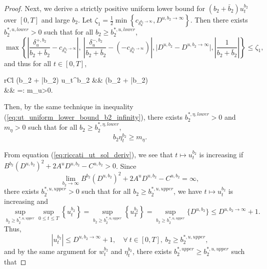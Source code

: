 \documentclass[11pt]{article}
\begin{document}
\begin{proof}
	Next, we derive a strictly positive uniform lower bound for $(b_2 + \bar{b}_2) u_t^{b_2}$ over $[0,T]$ and large $b_2$. Let $\zeta_1 =\frac{1}{2} \min \left\{ c_{\delta_u^{b_2 \to \infty}}, D^{u,b_2 \to \infty} \right\}$. Then there exists $b_2^{*,u,lower}>0$ such that for all $b_2 \geq b_2^{*,u,lower}$,
	$$ 
	\max \left\{  \left\vert \frac{\delta_u^{+,b_2}}{b_2 + \bar{b}_2}  - c_{\delta_u^{b_2 \to \infty}} \right\vert, \   \left\vert \frac{\delta_u^{-,b_2}}{b_2 + \bar{b}_2}  - \left(-c_{\delta_u^{b_2 \to \infty}}\right) \right\vert, \vert D^{u,b_2} - D^{u,b_2\to \infty} \vert,  \left\vert \frac{1}{b_2 + \bar{b}_2} \right\vert  \right\} \leq \zeta_1,
	$$ 
	and thus for all $t \in [0,T]$,
	\begin{IEEEeqnarray}{rCl}
		(b_2 + \bar{b}_2) u_t^{b_2} &\geq&  (b_2 + \bar{b}_2)  \nonumber \\
		&\geq&  =: m_u>0.
	\label{eq:ut_uniform_lower_bound_b2_infinity}
	\end{IEEEeqnarray}
	Then, by the same technique in inequality (\ref{eq:ut_uniform_lower_bound_b2_infinity}), there exists $b_2^{*,\eta, lower} > 0$ and $m_\eta >0$ such that for all $b_2 \geq b_2^{*,\eta,lower}$,
	\begin{equation}
	   b_2 \eta_t^{b_2} \geq m_\eta.
	\label{eq:eta_t_uniform_lower_bound_b2_infinity}
	\end{equation}



	From equation (\ref{eq:riccati_ut_sol_deriv}), we see that $t \mapsto u_t^{b_2}$ is increasing if $B^{b_2} (D^{u,b_2})^2 + 2 A^u D^{u,b_2} - C^{u,b_2} > 0$. Since 
	$$\lim_{b_2 \to \infty} B^{b_2} (D^{u,b_2})^2 + 2 A^u D^{u,b_2} - C^{u,b_2} = \infty,$$
	there exists $b_2^{*,u,upper} >0$ such that for all $b_2 \geq b_2^{*,u,upper}$, we have $t \mapsto u_t^{b_2}$ is increasing and 
	$$ \sup_{b_2 \geq b_2^{*,u,upper}} \sup_{0\leq t \leq T} \left\{ u_t^{b_2} \right\} = \sup_{b_2 \geq b_2^{*,u,upper}} \left\{ u_T^{b_2}\right\}  = \sup_{b_2 \geq b_2^{*,u,upper}} \{ D^{u,b_2}  \} \leq D^{u,b_2 \to \infty} + 1.$$
	Thus,
	\begin{equation*}
	\left\vert u_t^{b_2}\right\vert \leq D^{u,b_2 \to \infty} + 1 , \quad \forall \  t\in[0,T],\ b_2 \geq b_2^{*,u,upper},
	\label{eq:u_t_bound}
	\end{equation*}
	and by the same argument for $w_t^{b_2}$ and $\eta_t^{b_2}$, there exists $b_2^{*,upper} \geq b_2^{*,u,upper}$ such that
	

\end{proof}
\end{document}
